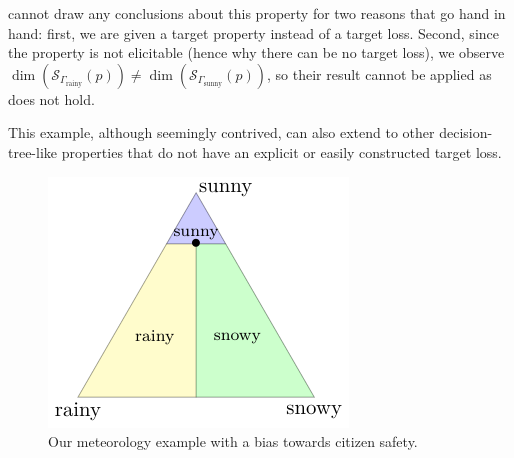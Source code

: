 \documentclass{article}
\newcommand{\Sc}{\mathcal{S}}  %
\begin{document}
\citet[Theorem 16]{ramaswamy2016convex} cannot draw any conclusions about this property for two reasons that go hand in hand: first, we are given a target property instead of a target loss.
Second, since the property is not elicitable (hence why there can be no target loss), we observe $\dim(\Sc_{\Gamma_{\text{rainy}}}(p)) \neq \dim(\Sc_{\Gamma_{\text{sunny}}}(p))$, so their result cannot be applied as~\citet[Lemma 23]{ramaswamy2016convex} does not hold.

This example, although seemingly contrived, can also extend to other decision-tree-like properties that do not have an explicit or easily constructed target loss.

\begin{figure}
	\centering
	\includegraphics[width=0.3\linewidth]{tikz/t-example.pdf}
	\caption{Our meteorology example with a bias towards citizen safety.}
	\label{fig:t-example}
\end{figure}
\end{document}
